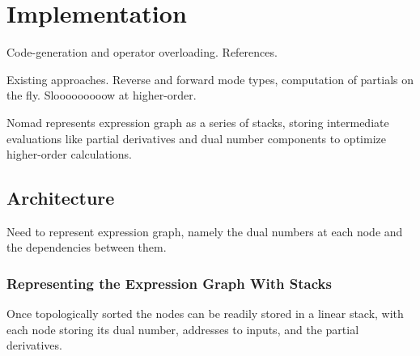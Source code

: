 \chapter{Implementation}

Code-generation and operator overloading.  References.

Existing approaches.  Reverse and forward mode types,
computation of partials on the fly.  Slooooooooow at higher-order.  

Nomad represents expression graph as a series of stacks,
storing intermediate evaluations like partial derivatives and
dual number components to optimize higher-order calculations.

\section{Architecture}

Need to represent expression graph, namely the dual numbers
at each node and the dependencies between them.

\subsection{Representing the Expression Graph With Stacks}

Once topologically sorted the nodes can be readily stored in
a linear stack, with each node storing its dual number, addresses
to inputs, and the partial derivatives.

